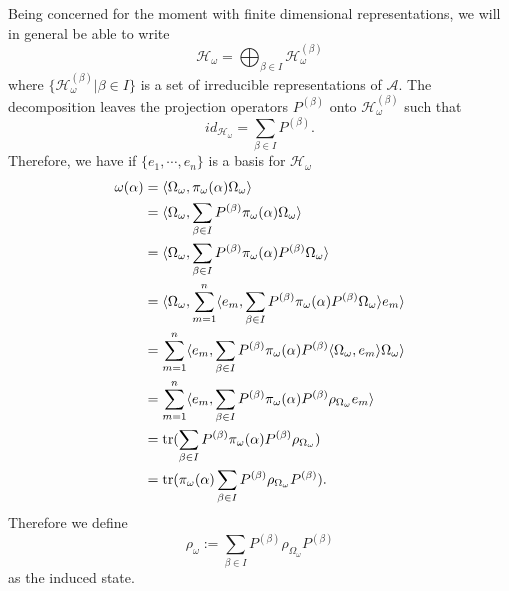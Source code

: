 Being concerned for the moment with finite dimensional representations, we will in general be able to write
\begin{equation}
\mathcal{H}_\omega = \bigoplus_{\beta\in I}\mathcal{H}_\omega^{(\beta)}
\end{equation}
where $\{\mathcal{H}_\omega^{(\beta)}|\beta\in I\}$ is a set of irreducible representations of $\mathcal{A}$. The decomposition leaves the projection operators $P^{(\beta)}$ onto $\mathcal{H}_\omega^{(\beta)}$ such that
\begin{equation}
id_{\mathcal{H}_\omega}=\sum_{\beta\in I}P^{(\beta)}.
\end{equation}
Therefore, we have if $\{e_1,\cdots,e_n\}$ is a basis for $\mathcal{H}_\omega$
\begin{align}
\begin{split}
\omega(\alpha)&=\langle \Omega_\omega, \pi_\omega(\alpha)\Omega_\omega\rangle \\
&=\langle\Omega_\omega,\sum_{\beta\in I}P^{(\beta)}\pi_\omega(\alpha)\Omega_\omega\rangle \\
&=\langle\Omega_\omega,\sum_{\beta\in I}P^{(\beta)}\pi_\omega(\alpha)P^{(\beta)}\Omega_\omega\rangle \\
&=\langle\Omega_\omega,\sum_{m=1}^n\langle e_m,\sum_{\beta\in I}P^{(\beta)}\pi_\omega(\alpha) P^{(\beta)}\Omega_\omega\rangle e_m\rangle \\
&=\sum_{m=1}^n\langle e_m,\sum_{\beta\in I}P^{(\beta)}\pi_\omega(\alpha) P^{(\beta)}\langle\Omega_\omega, e_m\rangle\Omega_\omega\rangle \\
&=\sum_{m=1}^n\langle e_m,\sum_{\beta\in I}P^{(\beta)}\pi_\omega(\alpha) P^{(\beta)}\rho_{\Omega_\omega} e_m\rangle \\
&=\operatorname{tr}(\sum_{\beta\in I}P^{(\beta)}\pi_\omega(\alpha) P^{(\beta)}\rho_{\Omega_\omega})\\
&=\operatorname{tr}(\pi_\omega(\alpha)\sum_{\beta\in I}P^{(\beta)}\rho_{\Omega_\omega} P^{(\beta)}).
\end{split}
\end{align}
Therefore we define
\begin{equation}
\rho_\omega := \sum_{\beta\in I}P^{(\beta)}\rho_{\Omega_\omega} P^{(\beta)}
\end{equation}
as the induced state.

